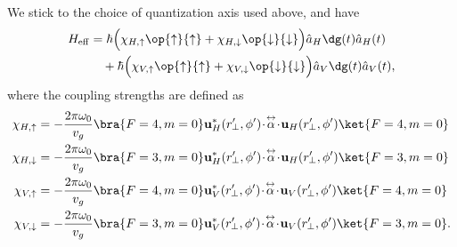 We stick to the choice of quantization axis used above, and have
\begin{align}
H_{\rm eff} & =  \hbar \Big( \chi_{H,\uparrow}\op{\uparrow}{\uparrow} +  
\chi_{H,\downarrow} \op{\downarrow}{\downarrow} \Big) \hat{a}_H\dg(t) \hat{a}_H(t) \nonumber\\
&\quad +  \hbar  \Big( \chi_{V,\uparrow}\op{\uparrow}{\uparrow} +  \chi_{V,\downarrow} 
\op{\downarrow}{\downarrow} \Big) \hat{a}_V\dg(t) \hat{a}_V(t)  ,\label{eq:Heffupdown}
\end{align}
where the coupling strengths are defined as
\begin{align}
\chi_{H,\uparrow} &=  -\frac{2\pi\omega_0}{v_g} \bra{F=4,m=0} 
\mathbf{u}^*_{H}(r^\prime\!\!_\perp,\phi') \!\cdot\!\tensor{\alpha}\!\cdot\! 
\mathbf{u}_{H}(r^\prime\!\!_\perp,\phi') \ket{F=4,m=0}\\
\chi_{H,\downarrow} &=  -\frac{2\pi\omega_0}{v_g}  \bra{F=3,m=0} 
\mathbf{u}^*_{H}(r^\prime\!\!_\perp,\phi') \!\cdot\!\tensor{\alpha}\!\cdot\! 
\mathbf{u}_{H}(r^\prime\!\!_\perp,\phi') \ket{F=3,m=0} \\
\chi_{V,\uparrow} &=  -\frac{2\pi\omega_0}{v_g}   \bra{F=4,m=0} 
\mathbf{u}^*_{V}(r^\prime\!\!_\perp,\phi') \!\cdot\!\tensor{\alpha}\!\cdot\! 
\mathbf{u}_{V}(r^\prime\!\!_\perp,\phi') \ket{F=4,m=0}  \\
\chi_{V,\downarrow} &=  -\frac{2\pi\omega_0}{v_g}  \bra{F=3,m=0} 
\mathbf{u}^*_{V}(r^\prime\!\!_\perp,\phi') \!\cdot\!\tensor{\alpha}\!\cdot\! 
\mathbf{u}_{V}(r^\prime\!\!_\perp,\phi') \ket{F=3,m=0}. 
\end{align}

